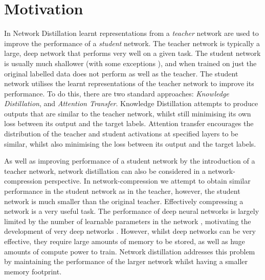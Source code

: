 \documentclass[a4paper,11pt]{article}
\begin{document}
\section{Motivation}
\label{sec:motivation}
In Network Distillation \cite{ba2014deep} \cite{hinton2015distilling} learnt representations from a \textit{teacher} network are used to improve the performance of a \textit{student} network. The teacher network is typically a large, deep network that performs very well on a given task. The student network is usually much shallower (with some exceptions \cite{furlanello2018born}), and when trained on just the original labelled data does not perform as well as the teacher. The student network utilises the learnt representations of the teacher network to improve its performance. To do this, there are two standard approaches: \textit{Knowledge Distillation}, and \textit{Attention Transfer}. Knowledge Distillation attempts to produce outputs that are similar to the teacher network, whilst still minimising its own loss between its output and the target labels. Attention transfer encourages the distribution of the teacher and student activations at specified layers to be similar,  whilst also minimising the loss between its output and the target labels. 

As well as improving performance of a student network by the introduction of a teacher network, network distillation can also be considered in a network-compression perspective. In network-compression we attempt to obtain similar performance in the student network as in the teacher, however, the student network is much smaller than the original teacher. Effectively compressing a network is a very useful task. The performance of deep neural networks is largely limited by the number of learnable parameters in the network \cite{lecun2015deep}, motivating the development of very deep networks \cite{shazeer2017outrageously}. However, whilst deep networks can be very effective, they require large amounts of memory to be stored, as well as huge amounts of compute power to train. Network distillation addresses this problem by maintaining the performance of the larger network whilst having a smaller memory footprint. 
\end{document}
